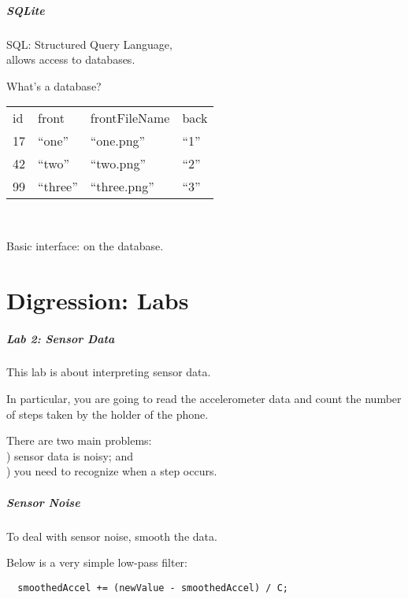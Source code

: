 \begin{frame}
\frametitle{SQLite}

\begin{changemargin}{1cm}
SQL: Structured Query Language, \\
allows access to databases.

What's a database?

\begin{center}
\begin{tabular}{l|l|l|l}
id & front & frontFileName & back \\
17 & ``one'' & ``one.png'' & ``1'' \\
42 & ``two'' & ``two.png'' & ``2'' \\
99 & ``three'' & ``three.png'' & ``3'' \\
\end{tabular}
\end{center}
~

Basic interface:  on the database.

\end{changemargin}

\end{frame}

\part{Digression: Labs}
\frame{\partpage}


\begin{frame}
\frametitle{Lab 2: Sensor Data}
\begin{changemargin}{1cm}
This lab is about interpreting sensor data.

In particular, you are going to
read the accelerometer data and count the number of steps taken by the holder
of the phone. 

There are two main problems:\\
) sensor data is noisy; and\\
) you need
to recognize when a step occurs.
\end{changemargin}
\end{frame}

\begin{frame}[fragile]
\frametitle{Sensor Noise}
\begin{changemargin}{1cm}


To deal with sensor noise, smooth the data.

Below is a very simple low-pass filter:

\begin{verbatim}
  smoothedAccel += (newValue - smoothedAccel) / C;
\end{verbatim}

\end{changemargin}
\end{frame}

